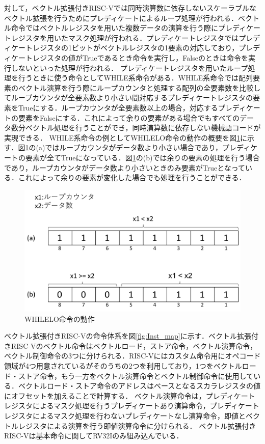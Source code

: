 対して，ベクトル拡張付きRISC-Vでは同時演算数に依存しないスケーラブルなベクトル拡張を行うためにプレディケートによるループ処理が行われる．ベクトル命令ではベクトルレジスタを用いた複数データの演算を行う際にプレディケートレジスタを用いたマスク処理が行われる．プレディケートレジスタではプレディケートレジスタの1ビットがベクトルレジスタの1要素の対応しており，プレディケートレジスタの値がTrueであるとき命令を実行し，Falseのときは命令を実行しないといった処理が行われる．
プレディケートレジスタを用いたループ処理を行うときに使う命令としてWHILE系命令がある．WHILE系命令では配列要素のベクトル演算を行う際にループカウンタと処理する配列の全要素数を比較してループカウンタが全要素数より小さい間対応するプレディケートレジスタの要素をTrueにする．ループカウンタが全要素数以上の場合，対応するプレディケートの要素をFalseにする．これによって余りの要素がある場合でもすべてのデータ数分ベクトル処理を行うことができ，同時演算数に依存しない機械語コードが実現できる．
WHILE系命令の例としてWHILELO命令の動作の概要を図\ref{fig:predicate}に示す．図\ref{fig:predicate}の(a)ではループカウンタがデータ数より小さい場合であり，プレディケートの要素が全てTrueになっている．図\ref{fig:predicate}の(b)では余りの要素の処理を行う場合であり，ループカウンタがデータ数より小さいときのみ要素がTrueとなっている．これによって余りの要素が変化した場合でも処理を行うことができる．

\begin{figure}[tb]
    \centering
    \includegraphics[scale=0.5]{image/predicate.pdf}
    \caption{WHILELO命令の動作}
    \label{fig:predicate}
\end{figure}

ベクトル拡張付きRISC-Vの命令体系を図\ref{fig:Inst_map}に示す．ベクトル拡張付きRISC-Vのベクトル命令はベクトルロード，ストア命令，ベクトル演算命令，ベクトル制御命令の3つに分けられる．RISC-Vにはカスタム命令用にオペコード領域が4つ用意されているがそのうちの2つを利用しており，1つをベクトルロード・ストア命令，もう一方をベクトル演算命令とベクトル制御命令に使用している．ベクトルロード・ストア命令のアドレスはベースとなるスカラレジスタの値にオフセットを加えることで計算する．
ベクトル演算命令は，プレディケートレジスタによるマスク処理を行うプレディケートあり演算命令，プレディケートレジスタによるマスク処理を行わないプレディケートなし演算命令，即値とベクトルレジスタによる演算を行う即値演算命令に分けられる．
ベクトル拡張付きRISC-Vは基本命令に関してRV32Iのみ組み込んでいる．

